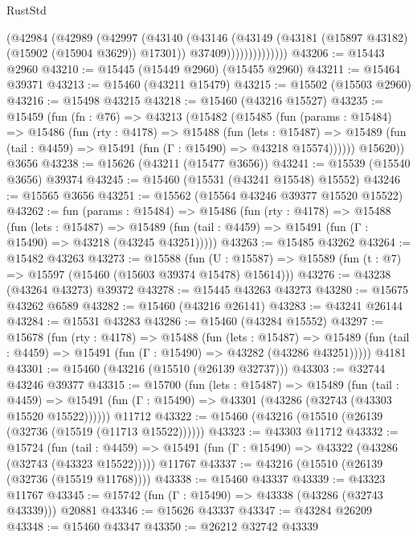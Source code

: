 \begin{lexlean}{RustStd}
\begin{coremodule}
                      (@42984
                        (@42989
                          (@42997
                            (@43140
                              (@43146
                                (@43149 (@43181 (@15897 @43182) (@15902 (@15904 @3629)) @17301))
                                @37409))))))))))))))
@43206 := @15443 @2960
@43210 := @15445 (@15449 @2960) (@15455 @2960)
@43211 := @15464 @39371
@43213 := @15460 (@43211 @15479)
@43215 := @15502 (@15503 @2960)
@43216 := @15498 @43215
@43218 := @15460 (@43216 @15527)
@43235 := @15459
    (fun (fn : @76) =>
    @43213
      (@15482
        (@15485
          (fun (params : @15484) =>
          @15486
            (fun (rty : @4178) =>
            @15488
              (fun (lets : @15487) =>
              @15489 (fun (tail : @4459) => @15491 (fun (Γ : @15490) => @43218 @15574))))))
        @15620))
    @3656
@43238 := @15626 (@43211 (@15477 @3656))
@43241 := @15539 (@15540 @3656) @39374
@43245 := @15460 (@15531 (@43241 @15548) @15552)
@43246 := @15565 @3656
@43251 := @15562 (@15564 @43246 @39377 @15520 @15522)
@43262 := fun (params : @15484) =>
  @15486
    (fun (rty : @4178) =>
    @15488
      (fun (lets : @15487) =>
      @15489 (fun (tail : @4459) => @15491 (fun (Γ : @15490) => @43218 (@43245 @43251)))))
@43263 := @15485 @43262
@43264 := @15482 @43263
@43273 := @15588
    (fun (U : @15587) => @15589 (fun (t : @7) => @15597 (@15460 (@15603 @39374 @15478) @15614)))
@43276 := @43238 (@43264 @43273) @39372
@43278 := @15445 @43263 @43273
@43280 := @15675 @43262 @6589
@43282 := @15460 (@43216 @26141)
@43283 := @43241 @26144
@43284 := @15531 @43283
@43286 := @15460 (@43284 @15552)
@43297 := @15678
    (fun (rty : @4178) =>
    @15488
      (fun (lets : @15487) =>
      @15489 (fun (tail : @4459) => @15491 (fun (Γ : @15490) => @43282 (@43286 @43251)))))
    @4181
@43301 := @15460 (@43216 (@15510 (@26139 @32737)))
@43303 := @32744 @43246 @39377
@43315 := @15700
    (fun (lets : @15487) =>
    @15489
      (fun (tail : @4459) =>
      @15491 (fun (Γ : @15490) => @43301 (@43286 (@32743 (@43303 @15520 @15522))))))
    @11712
@43322 := @15460 (@43216 (@15510 (@26139 (@32736 (@15519 (@11713 @15522))))))
@43323 := @43303 @11712
@43332 := @15724
    (fun (tail : @4459) => @15491 (fun (Γ : @15490) => @43322 (@43286 (@32743 (@43323 @15522)))))
    @11767
@43337 := @43216 (@15510 (@26139 (@32736 (@15519 @11768))))
@43338 := @15460 @43337
@43339 := @43323 @11767
@43345 := @15742 (fun (Γ : @15490) => @43338 (@43286 (@32743 @43339))) @20881
@43346 := @15626 @43337
@43347 := @43284 @26209
@43348 := @15460 @43347
@43350 := @26212 @32742 @43339

\end{coremodule}
\end{lexlean}
